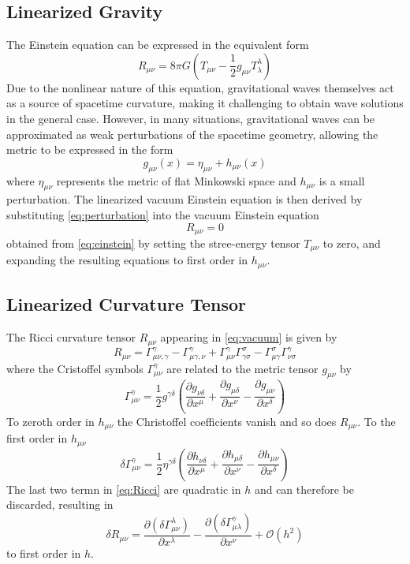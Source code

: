 \documentclass[a4paper,12pt]{extarticle}
\newcommand{\mn}{{\mu\nu}}
\numberwithin{equation}{subsection}
\begin{document}
\subsection{Linearized Gravity}
The Einstein equation can be expressed in the equivalent form
\begin{equation}
\label{eq:einstein}
R_\mn=8\pi G\left(T_\mn-\frac{1}{2}g_\mn T_\lambda^\lambda\right)
\end{equation}
Due to the nonlinear nature of this equation, gravitational waves themselves act as a source of spacetime curvature, making it challenging to obtain wave solutions in the general case. However, in many situations, gravitational waves can be approximated as weak perturbations of the spacetime geometry, allowing the metric to be expressed in the form
\begin{equation}
\label{eq:perturbation}
g_\mn(x)=\eta_\mn+h_\mn(x)
\end{equation}
where $\eta_\mn$ represents the metric of flat Minkowski space and $h_\mn$ is a small perturbation. The linearized vacuum Einstein equation is then derived by substituting \eqref{eq:perturbation} into the vacuum Einstein equation
\begin{equation}
\label{eq:vacuum}
R_\mn=0
\end{equation}
obtained from \eqref{eq:einstein} by setting the stree-energy tensor $T_\mn$ to zero, and expanding the resulting equations to first order in $h_\mn$.
\newpage
\subsection{Linearized Curvature Tensor}
The Ricci curvature tensor $R_\mn$ appearing in \eqref{eq:vacuum} is given by 
\begin{equation}
\label{eq:Ricci}
R_\mn=\Gamma^\gamma_{\mn,\gamma}-\Gamma^\gamma_{\mu\gamma,\nu}+\Gamma^\gamma_{\mn}\Gamma^\sigma_{\gamma\sigma}-\Gamma^\sigma_{\mu\gamma}\Gamma^\gamma_{\nu\sigma}
\end{equation}
where the Cristoffel symbols $\Gamma^\gamma_\mn$ are related to the metric tensor $g_\mn$ by
\begin{equation}
\Gamma^\gamma_\mn=\frac{1}{2}g^{\gamma\delta}\left(\frac{\partial g_{\nu\delta}}{\partial x^\mu}+\frac{\partial g_{\mu\delta}}{\partial x^\nu}-\frac{\partial g_\mn}{\partial x^\delta}\right)
\end{equation}
To zeroth order in $h_\mn$ the Christoffel coefficients vanish and so does $R_\mn$. To the first order in $h_\mn$
\begin{equation}
\label{eq:dG}
\delta \Gamma^\gamma_\mn=\frac{1}{2}\eta^{\gamma\delta}\left(\frac{\partial h_{\nu\delta}}{\partial x^\mu}+\frac{\partial h_{\mu\delta}}{\partial x^\nu}-\frac{\partial h_\mn}{\partial x^\delta}\right)
\end{equation}
The last two termn in \eqref{eq:Ricci} are quadratic in $h$ and can therefore be discarded, resulting in
\begin{equation}
\label{eq:dR}
\delta R_\mn=\frac{\partial(\delta\Gamma^\lambda_\mn)}{\partial x^\lambda}-\frac{\partial(\delta\Gamma^\gamma_{\mu\lambda})}{\partial x^\nu}+\mathcal{O}(h^2)
\end{equation}
to first order in $h$.
\end{document}
